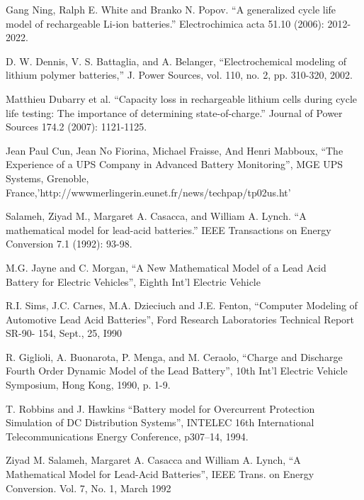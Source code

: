 


Gang Ning, Ralph E. White and Branko N. Popov. ``A generalized cycle life model of rechargeable Li-ion batteries.'' Electrochimica acta 51.10 (2006): 2012-2022.

D. W. Dennis, V. S. Battaglia, and A. Belanger, ``Electrochemical
modeling of lithium polymer batteries,'' J. Power Sources, vol. 110,
no. 2, pp. 310-320, 2002.

Matthieu Dubarry et al. ``Capacity loss in rechargeable lithium cells during cycle life testing: The importance of determining state-of-charge.'' Journal of Power Sources 174.2 (2007): 1121-1125.

Jean Paul Cun, Jean No Fiorina, Michael Fraisse, And Henri Mabboux, ``The Experience of a
UPS Company in Advanced Battery Monitoring'',
MGE UPS Systems, Grenoble, France,'http://wwwmerlingerin.eunet.fr/news/techpap/tp02us.ht'

Salameh, Ziyad M., Margaret A. Casacca, and William A. Lynch. ``A mathematical model for lead-acid batteries.'' IEEE Transactions on Energy Conversion 7.1 (1992): 93-98.

M.G. Jayne and  C. Morgan, ``A New
Mathematical Model of a Lead Acid Battery for
Electric Vehicles'', Eighth Int'l Electric Vehicle


R.I. Sims, J.C. Carnes, M.A. Dzieciuch and
J.E. Fenton, ``Computer Modeling of Automotive
Lead Acid Batteries'', Ford Research Laboratories
Technical Report SR-90- 154, Sept., 25, I990

R. Giglioli, A. Buonarota, P. Menga, and M. Ceraolo, ``Charge and Discharge Fourth
Order Dynamic Model of the Lead Battery'', 10th Int'l
Electric Vehicle Symposium, Hong Kong, 1990, p. 1-9.

T. Robbins and J. Hawkins ``Battery model for
Overcurrent Protection Simulation of DC Distribution Systems'', INTELEC 16th
International Telecommunications Energy
Conference, p307--14, 1994.

Ziyad M. Salameh, Margaret A. Casacca and William
A. Lynch, ``A Mathematical Model for Lead-Acid
Batteries'', IEEE Trans. on Energy Conversion. Vol. 7,
No. 1, March 1992

